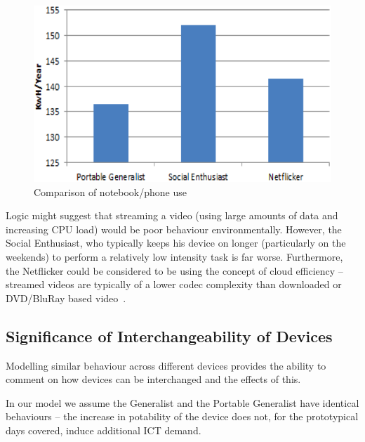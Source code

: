 \documentclass[conference]{IEEEtran}
\begin{document}
\begin{figure}
\centering
\includegraphics[width=0.9\columnwidth]{images/comparison_users_devices.png}
\caption{Comparison of notebook/phone use}
\label{fig:comparison_users_devices.png} 
\end{figure}

Logic might suggest that streaming a video (using large amounts of
data and increasing CPU load) would be poor behaviour
environmentally. However, the Social Enthusiast, who typically keeps
his device on longer (particularly on the weekends) to perform a
relatively low intensity task is far worse. Furthermore, the
Netflicker could be considered to be using the concept of cloud
efficiency -- streamed videos are typically of a lower codec
complexity than downloaded or DVD/BluRay based
video~\cite{schien-et-al:2013}.

\subsection{Significance of Interchangeability of Devices}

Modelling similar behaviour across different devices provides the
ability to comment on how devices can be interchanged and the effects
of this.


In our model we assume the Generalist and the Portable Generalist have
identical behaviours -- the increase in potability of the device does
not, for the prototypical days covered, induce additional ICT demand.
\end{document}
